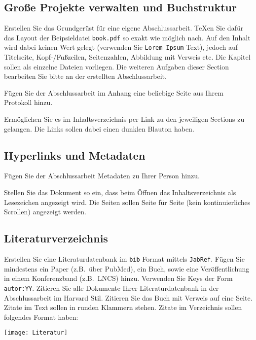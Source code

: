 \subsection{Große Projekte verwalten und Buchstruktur}				%
\begin{aufgabe}
Erstellen Sie das Grundger\"ust f\"ur eine eigene Abschlussarbeit. \TeX en
Sie daf\"ur das Layout der Beipsieldatei \texttt{book.pdf} so exakt wie
m\"oglich nach. Auf den Inhalt wird dabei keinen Wert gelegt (verwenden Sie
\texttt{Lorem Ipsum} Text), jedoch auf Titelseite, Kopf-/Fu\ss zeilen,
Seitenzahlen, Abbildung mit Verweis etc. Die Kapitel sollen als einzelne
Dateien vorliegen. Die weiteren Aufgaben dieser Section bearbeiten Sie bitte
an der erstellten Abschlussarbeit. 
\end{aufgabe}

\begin{aufgabe}
F\"ugen Sie der Abschlussarbeit im Anhang eine beliebige Seite aus Ihrem Protokoll hinzu. 
\end{aufgabe}

\begin{aufgabe}
Erm\"oglichen Sie es im Inhaltsverzeichnis per Link zu den jeweiligen Sections zu gelangen. Die Links sollen dabei einen dunklen Blauton haben.  
\end{aufgabe}

\subsection{Hyperlinks und Metadaten}						%
\begin{aufgabe}
F\"ugen Sie der Abschlussarbeit Metadaten zu Ihrer Person hinzu.
\end{aufgabe}

\begin{aufgabe}
Stellen Sie das Dokument so ein, dass beim \"Offnen das Inhaltsverzeichnis als Lesezeichen angezeigt wird. Die Seiten sollen Seite f\"ur Seite (kein kontinuierliches Scrollen) angezeigt werden. 	
\end{aufgabe}

\subsection{Literaturverzeichnis}						%
\begin{aufgabe}
Erstellen Sie eine Literaturdatenbank im \texttt{bib} Format mittels
\texttt{JabRef}. F\"ugen Sie mindestens ein Paper (z.B.\ \"uber PubMed), ein
Buch, sowie eine Ver\"offentlichung in einem Konferenzband (z.B.\ LNCS)
hinzu. Verwenden Sie Keys der Form \texttt{autor:YY}. Zitieren Sie alle
Dokumente Ihrer Literaturdatenbank in der Abschlussarbeit im Harvard Stil. Zitieren Sie das
Buch mit Verweis auf eine Seite. Zitate im Text sollen in runden Klammern
stehen. Zitate im Verzeichnis sollen folgendes Format haben:

\medskip
\noindent\texttt{[image: Literatur]}
\end{aufgabe}
